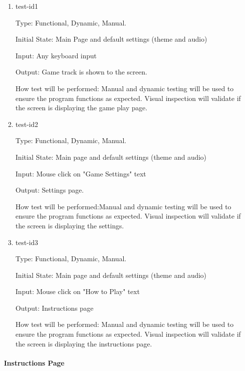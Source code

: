 \documentclass[12pt, titlepage]{article}
\begin{document}
\begin{enumerate}
	
	\item{test-id1\\}
	
	Type: Functional, Dynamic, Manual. 
	
	Initial State: Main Page and default settings (theme and audio)
	
	Input: Any keyboard input 
	
	Output: Game track is shown to the screen. 
	
	How test will be performed: Manual and dynamic testing will be used to ensure the program functions as expected. Visual inspection will validate if the screen is displaying the game play page. 
	
	\item{test-id2\\}
	
	Type: Functional, Dynamic, Manual.
	
	Initial State: Main page and default settings (theme and audio) 
	
	Input: Mouse click on "Game Settings" text
	
	Output: Settings page. 
	
	How test will be performed:Manual and dynamic testing will be used to ensure the program functions as expected. Visual inspection will validate if the screen is displaying the settings.  
	
	\item{test-id3\\}
	
	Type: Functional, Dynamic, Manual.
	
	Initial State: Main page and default settings (theme and audio) 
	
	Input: Mouse click on "How to Play" text
	
	Output: Instructions page
	
	How test will be performed: Manual and dynamic testing will be used to ensure the program functions as expected. Visual inspection will validate if the screen is displaying the instructions page. 
	
\end{enumerate}

\paragraph{Instructions Page}
\end{document}
